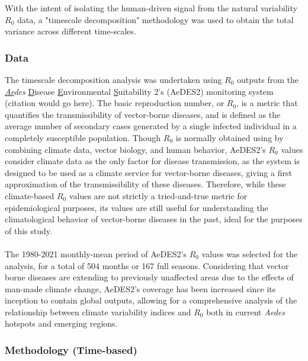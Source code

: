 \documentclass[fleqn,10pt]{wlscirep}
\begin{document}
  With the intent of isolating the human-driven signal from the natural variability $R_0$ data, a "timescale decomposition" methodology was used to obtain the total variance across different time-scales. 

  \subsubsection{Data} \label{sec-methods-1-data}
  The timescale decomposition analysis was undertaken using $R_0$ outputs from the \textit{\underline{Ae}des} \underline{D}isease \underline{E}nvironmental \underline{S}uitability 2's (AeDES2) monitoring system (citation would go here). The basic reproduction number, or $R_0$, is a metric that quantifies the transmissibility of vector-borne diseases, and is defined as the average number of secondary cases generated by a single infected individual in a completely susceptible population. Though $R_0$ is normally obtained using by combining climate data, vector biology, and human behavior, AeDES2's $R_0$ values consider climate data as the only factor for disease transmission, as the system is designed to be used as a climate service for vector-borne diseases, giving a first approximation of the transmissibility of these diseases. Therefore, while these climate-based $R_0$ values are not strictly a tried-and-true metric for epidemiological purposes, its values are still useful for understanding the climatological behavior of vector-borne diseases in the past, ideal for the purposes of this study.
\\
\\
  The 1980-2021 monthly-mean period of AeDES2's $R_0$ values was selected for the analysis, for a total of 504 months or 167 full seasons. Considering that vector borne diseases are extending to previously unaffected areas due to the effects of man-made climate change, AeDES2's coverage has been increased since its inception to contain global outputs, allowing for a comprehensive analysis of the relationship between climate variability indices and $R_0$ both in current \textit{Aedes} hotspots and emerging regions.

  \subsubsection{Methodology (Time-based)} \label{sec-methods-1-methodology}
\end{document}
